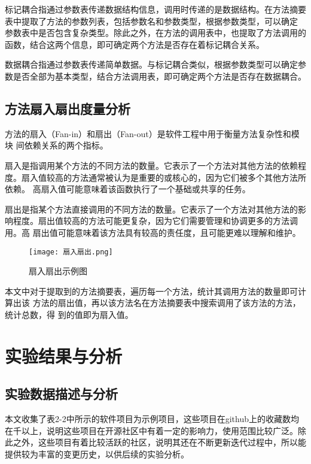 标记耦合指通过参数表传递数据结构信息，调用时传递的是数据结构。在方法摘要
表中提取了方法的参数列表，包括参数名和参数类型，根据参数类型，可以确定
参数表中是否包含复杂类型。除此之外，在方法的调用表中，也提取了方法调用的
函数，结合这两个信息，即可确定两个方法是否存在着标记耦合关系。


数据耦合指通过参数表传递简单数据。与标记耦合类似，根据参数类型可以确定参
数是否全部为基本类型，结合方法调用表，即可确定两个方法是否存在数据耦合。
\subsection{方法扇入扇出度量分析}

方法的扇入（Fan-in）和扇出（Fan-out）是软件工程中用于衡量方法复杂性和模块
间依赖关系的两个指标。


扇入是指调用某个方法的不同方法的数量。它表示了一个方法对其他方法的依赖程
度。扇入值较高的方法通常被认为是重要的或核心的，因为它们被多个其他方法所依赖。
高扇入值可能意味着该函数执行了一个基础或共享的任务。


扇出是指某个方法直接调用的不同方法的数量。它表示了一个方法对其他方法的影
响程度。扇出值较高的方法可能更复杂，因为它们需要管理和协调更多的方法调用。高
扇出值可能意味着该方法具有较高的责任度，且可能更难以理解和维护。

\begin{figure}[h]
\centering
\texttt{[image: 扇入扇出.png]}
\caption{扇入扇出示例图}
\end{figure}

本文中对于提取到的方法摘要表，遍历每一个方法，统计其调用方法的数量即可计算出该
方法的扇出值，再以该方法名在方法摘要表中搜索调用了该方法的方法，统计总数，得
到的值即为扇入值。

\section{实验结果与分析}

\subsection{实验数据描述与分析}
本文收集了表2-2中所示的软件项目为示例项目，这些项目在github上的收藏数均在千以上，说明这些项目在开源社区中有着一定的影响力，使用范围比较广泛。除此之外，这些项目有着比较活跃的社区，说明其还在不断更新迭代过程中，所以能提供较为丰富的变更历史，以供后续的实验分析。

